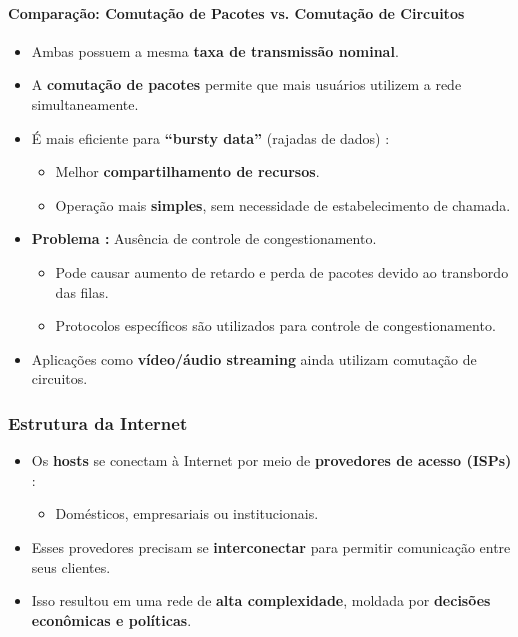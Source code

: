     \paragraph{Comparação: Comutação de Pacotes vs. Comutação de Circuitos}
    \begin{itemize}[left=0.5cm, align=left, nosep]
        \item Ambas possuem a mesma \textbf{taxa de transmissão nominal}.
        \item A \textbf{comutação de pacotes} permite que mais usuários utilizem a rede simultaneamente.
        \item É mais eficiente para \textbf{“bursty data”} (rajadas de dados) :     
        \begin{itemize}[left=0.5cm, nosep, label=$\hookrightarrow$]
            \item Melhor \textbf{compartilhamento de recursos}.
            \item Operação mais \textbf{simples}, sem necessidade de estabelecimento de chamada. 
        \end{itemize} 
        \item \textbf{Problema :} Ausência de controle de congestionamento. 
        \begin{itemize}[left=0.5cm, nosep, label=$\hookrightarrow$]
            \item Pode causar aumento de retardo e perda de pacotes devido ao transbordo das filas. 
            \item Protocolos específicos são utilizados para controle de congestionamento. 
        \end{itemize} 
        \item Aplicações como \textbf{vídeo/áudio streaming} ainda utilizam comutação de circuitos.
    \end{itemize}

    \subsubsection*{Estrutura da Internet}
    
    \begin{itemize}[left=0.5cm, align=left, nosep]
        \item Os \textbf{hosts} se conectam à Internet por meio de \textbf{provedores de acesso (ISPs)} :
        \begin{itemize}[left=0.5cm, nosep, label=$\hookrightarrow$]
            \item Domésticos, empresariais ou institucionais.
        \end{itemize} 

        \item Esses provedores precisam se \textbf{interconectar} para permitir comunicação entre seus clientes.
        \item Isso resultou em uma rede de \textbf{alta complexidade}, moldada por \textbf{decisões econômicas e políticas}.
    \end{itemize}

